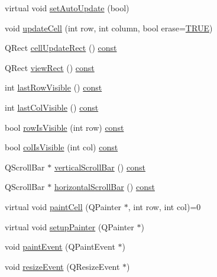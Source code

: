 \begin{DoxyCompactItemize}
\item 
virtual void \hyperlink{classQtTableView_a19d736b7339c22fc5da4078bdaf0b511}{set\+Auto\+Update} (bool)
\item 
void \hyperlink{classQtTableView_a0d0efc272d6342a95ad1a422e85dda26}{update\+Cell} (int row, int column, bool erase=\hyperlink{xpm2img_8c_aa8cecfc5c5c054d2875c03e77b7be15d}{T\+R\+U\+E})
\item 
Q\+Rect \hyperlink{classQtTableView_aab7dae7d565a5ffa938cdf0d598a0164}{cell\+Update\+Rect} () \hyperlink{tradstdc_8h_a2c212835823e3c54a8ab6d95c652660e}{const} 
\item 
Q\+Rect \hyperlink{classQtTableView_aa7492912a868befab25e5962cc37a8e0}{view\+Rect} () \hyperlink{tradstdc_8h_a2c212835823e3c54a8ab6d95c652660e}{const} 
\item 
int \hyperlink{classQtTableView_adde05168606400a7f06818910926b10f}{last\+Row\+Visible} () \hyperlink{tradstdc_8h_a2c212835823e3c54a8ab6d95c652660e}{const} 
\item 
int \hyperlink{classQtTableView_a9e2b863d015bcbcab43dcd605c601452}{last\+Col\+Visible} () \hyperlink{tradstdc_8h_a2c212835823e3c54a8ab6d95c652660e}{const} 
\item 
bool \hyperlink{classQtTableView_ab6b60d37b48106cd328e5d897ae1ffc5}{row\+Is\+Visible} (int row) \hyperlink{tradstdc_8h_a2c212835823e3c54a8ab6d95c652660e}{const} 
\item 
bool \hyperlink{classQtTableView_ad8a8bfdc4bb621e7b63b1dfbb53d0311}{col\+Is\+Visible} (int col) \hyperlink{tradstdc_8h_a2c212835823e3c54a8ab6d95c652660e}{const} 
\item 
Q\+Scroll\+Bar $\ast$ \hyperlink{classQtTableView_a3f8e596102e5ee3341577247678e0c05}{vertical\+Scroll\+Bar} () \hyperlink{tradstdc_8h_a2c212835823e3c54a8ab6d95c652660e}{const} 
\item 
Q\+Scroll\+Bar $\ast$ \hyperlink{classQtTableView_acd84a2d200f60076a1aeadc72c1d7867}{horizontal\+Scroll\+Bar} () \hyperlink{tradstdc_8h_a2c212835823e3c54a8ab6d95c652660e}{const} 
\item 
virtual void \hyperlink{classQtTableView_aff4cc53c37826859b641c10195dcc158}{paint\+Cell} (Q\+Painter $\ast$, int row, int col)=0
\item 
virtual void \hyperlink{classQtTableView_a471f1b6731bcdde9086c7f33b0902cbb}{setup\+Painter} (Q\+Painter $\ast$)
\item 
void \hyperlink{classQtTableView_a2775228b9e233580bd632040be990252}{paint\+Event} (Q\+Paint\+Event $\ast$)
\item 
void \hyperlink{classQtTableView_af3ca99080fca1fc5af5f702b4feb7528}{resize\+Event} (Q\+Resize\+Event $\ast$)

\end{DoxyCompactItemize}
